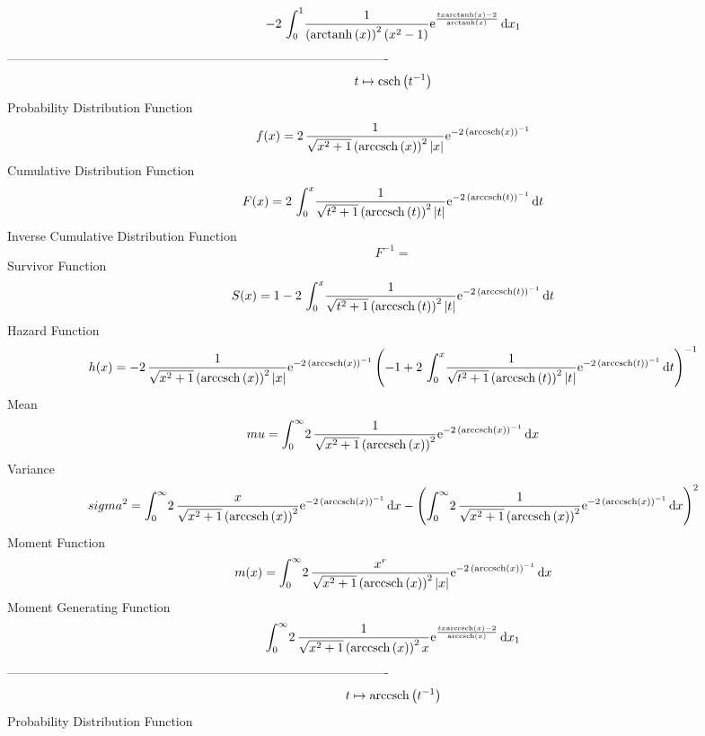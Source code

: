 \documentclass[12pt]{article}
\begin{document}
 $$-2\,\int_{0}^{1}\!{\frac {1}{ \left( {\rm arctanh} \left(x\right)
 \right) ^{2} \left( {x}^{2}-1 \right) }{{\rm e}^{{\frac {tx
{\rm arctanh} \left(x\right)-2}{{\rm arctanh} \left(x\right)}}}}}
\,{\rm d}x_{{1}}
$$-------------------------------------------------------------------------------------------  \\$$t\mapsto {\rm csch} \left({t}^{-1}\right)
$$Probability Distribution Function 
$$  f(x)=2\,{\frac {1}{\sqrt {{x}^{2}+1} \left( {\rm arccsch} \left(x\right)
 \right) ^{2} \left| x \right| }{{\rm e}^{-2\, \left( {\rm arccsch} 
\left(x\right) \right) ^{-1}}}}
$$Cumulative Distribution Function  
 $$F(x)=2\,\int_{0}^{x}\!{\frac {1}{\sqrt {{t}^{2}+1} \left( {\rm arccsch} 
\left(t\right) \right) ^{2} \left| t \right| }{{\rm e}^{-2\, \left( 
{\rm arccsch} \left(t\right) \right) ^{-1}}}}\,{\rm d}t
$$ Inverse Cumulative Distribution Function 
  $$F^{-1} = $$Survivor Function 
 $$ S(x)=1-2\,\int_{0}^{x}\!{\frac {1}{\sqrt {{t}^{2}+1} \left( {\rm arccsch} 
\left(t\right) \right) ^{2} \left| t \right| }{{\rm e}^{-2\, \left( 
{\rm arccsch} \left(t\right) \right) ^{-1}}}}\,{\rm d}t
$$ Hazard Function 
 $$ h(x)=-2\,{\frac {1}{\sqrt {{x}^{2}+1} \left( {\rm arccsch} \left(x\right)
 \right) ^{2} \left| x \right| }{{\rm e}^{-2\, \left( {\rm arccsch} 
\left(x\right) \right) ^{-1}}} \left( -1+2\,\int_{0}^{x}\!{\frac {1}{
\sqrt {{t}^{2}+1} \left( {\rm arccsch} \left(t\right) \right) ^{2}
 \left| t \right| }{{\rm e}^{-2\, \left( {\rm arccsch} \left(t\right)
 \right) ^{-1}}}}\,{\rm d}t \right) ^{-1}}
$$Mean 
 $$ mu=\int_{0}^{\infty }\!2\,{\frac {1}{\sqrt {{x}^{2}+1} \left( 
{\rm arccsch} \left(x\right) \right) ^{2}}{{\rm e}^{-2\, \left( 
{\rm arccsch} \left(x\right) \right) ^{-1}}}}\,{\rm d}x
$$ Variance 
 $$ sigma^2 = \int_{0}^{\infty }\!2\,{\frac {x}{\sqrt {{x}^{2}+1} \left( 
{\rm arccsch} \left(x\right) \right) ^{2}}{{\rm e}^{-2\, \left( 
{\rm arccsch} \left(x\right) \right) ^{-1}}}}\,{\rm d}x- \left( \int_{0
}^{\infty }\!2\,{\frac {1}{\sqrt {{x}^{2}+1} \left( {\rm arccsch} 
\left(x\right) \right) ^{2}}{{\rm e}^{-2\, \left( {\rm arccsch} \left(
x\right) \right) ^{-1}}}}\,{\rm d}x \right) ^{2}
$$Moment Function 
 $$ m(x) = \int_{0}^{\infty }\!2\,{\frac {{x}^{r}}{\sqrt {{x}^{2}+1} \left( 
{\rm arccsch} \left(x\right) \right) ^{2} \left| x \right| }{{\rm e}^{
-2\, \left( {\rm arccsch} \left(x\right) \right) ^{-1}}}}\,{\rm d}x
$$ Moment Generating Function 
 $$\int_{0}^{\infty }\!2\,{\frac {1}{\sqrt {{x}^{2}+1} \left( 
{\rm arccsch} \left(x\right) \right) ^{2}x}{{\rm e}^{{\frac {tx
{\rm arccsch} \left(x\right)-2}{{\rm arccsch} \left(x\right)}}}}}
\,{\rm d}x_{{1}}
$$-------------------------------------------------------------------------------------------  \\$$t\mapsto {\rm arccsch} \left({t}^{-1}\right)
$$Probability Distribution Function 
\end{document}
